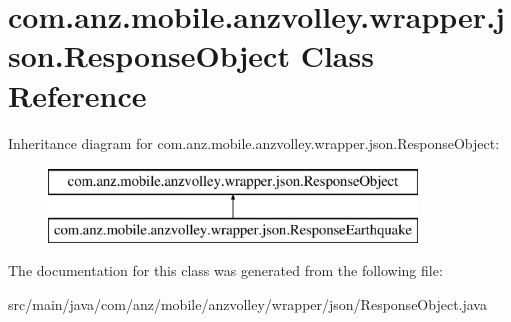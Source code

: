 \hypertarget{classcom_1_1anz_1_1mobile_1_1anzvolley_1_1wrapper_1_1json_1_1_response_object}{\section{com.\+anz.\+mobile.\+anzvolley.\+wrapper.\+json.\+Response\+Object Class Reference}
\label{classcom_1_1anz_1_1mobile_1_1anzvolley_1_1wrapper_1_1json_1_1_response_object}
}
Inheritance diagram for com.\+anz.\+mobile.\+anzvolley.\+wrapper.\+json.\+Response\+Object\+:\begin{figure}[H]
\begin{center}
\leavevmode
\includegraphics[height=2.000000cm]{classcom_1_1anz_1_1mobile_1_1anzvolley_1_1wrapper_1_1json_1_1_response_object}
\end{center}
\end{figure}


The documentation for this class was generated from the following file\+:\begin{DoxyCompactItemize}
\item 
src/main/java/com/anz/mobile/anzvolley/wrapper/json/Response\+Object.\+java\end{DoxyCompactItemize}
